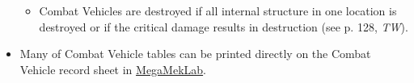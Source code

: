 \begin{itemize}
\begin{itemize}
    \item Combat Vehicles are destroyed if all internal structure in one location is destroyed or if the critical damage results in destruction (see p. 128, \emph{TW}).

  \end{itemize}

  \item Many of Combat Vehicle tables can be printed directly on the Combat Vehicle record sheet in \href{https://megamek.org}{MegaMekLab}.

\end{itemize}
